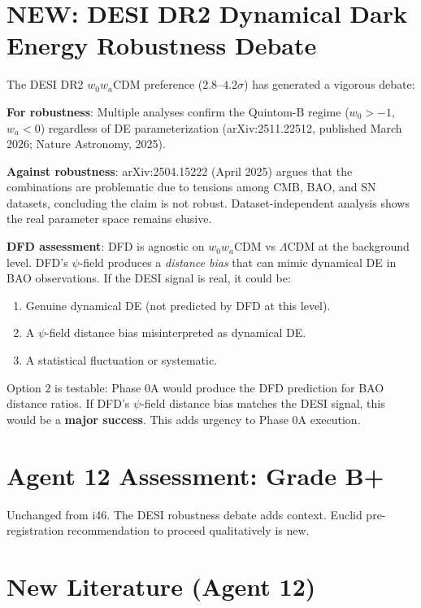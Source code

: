 \documentclass[11pt,a4paper]{article}
\newcommand{\NEW}{\textcolor{dfdblue}{\textbf{NEW}}}
\begin{document}
\section{\NEW: DESI DR2 Dynamical Dark Energy Robustness Debate}

\begin{tcolorbox}[colback=blue!5!white, colframe=blue!60!black,
  title={\NEW: DESI DR2 Dynamical DE --- Is the Evidence Robust?}]

The DESI DR2 $w_0 w_a$CDM preference ($2.8$--$4.2\sigma$) has generated a vigorous debate:

\textbf{For robustness}: Multiple analyses confirm the Quintom-B regime ($w_0 > -1$, $w_a < 0$) regardless of DE parameterization (arXiv:2511.22512, published March 2026; Nature Astronomy, 2025).

\textbf{Against robustness}: arXiv:2504.15222 (April 2025) argues that the combinations are problematic due to tensions among CMB, BAO, and SN datasets, concluding the claim is not robust. Dataset-independent analysis shows the real parameter space remains elusive.

\textbf{DFD assessment}: DFD is agnostic on $w_0 w_a$CDM vs $\Lambda$CDM at the background level. DFD's $\psi$-field produces a \emph{distance bias} that can mimic dynamical DE in BAO observations. If the DESI signal is real, it could be:
\begin{enumerate}
\item Genuine dynamical DE (not predicted by DFD at this level).
\item A $\psi$-field distance bias misinterpreted as dynamical DE.
\item A statistical fluctuation or systematic.
\end{enumerate}

Option 2 is testable: Phase 0A would produce the DFD prediction for BAO distance ratios. If DFD's $\psi$-field distance bias matches the DESI signal, this would be a \textbf{major success}. This adds urgency to Phase 0A execution.
\end{tcolorbox}

\section{Agent 12 Assessment: Grade B+}

Unchanged from i46. The DESI robustness debate adds context. Euclid pre-registration recommendation to proceed qualitatively is new.

\section{New Literature (Agent 12)}
\end{document}
